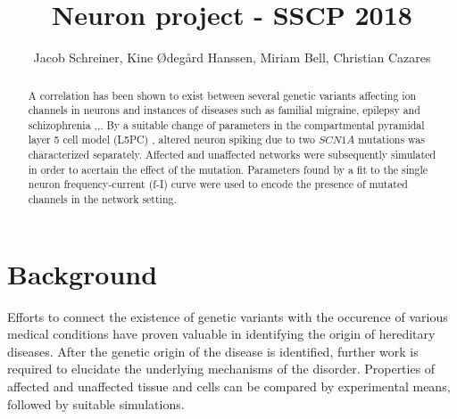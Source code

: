 \documentclass[twocolumn, a4paper,10pt, norsk]{scrartcl}
\title{Neuron project - SSCP 2018} %
\author{Jacob Schreiner, Kine Ødegård Hanssen, Miriam Bell, Christian Cazares}
\date{}
\begin{document}
\maketitle

\begin{abstract} %
 A correlation has been shown to exist between several genetic variants affecting ion channels in neurons and instances of diseases such as familial migraine, epilepsy and schizophrenia \cite{fhm},\cite{epilepsy},\cite{gautes}. By a suitable change of parameters in the compartmental pyramidal layer 5 cell model (L5PC) \cite{l5pc_model}, altered neuron spiking due to two $SCN1A$ mutations was characterized separately. Affected and unaffected networks were subsequently simulated in order to acertain the effect of the mutation. Parameters found by a fit to the single neuron frequency-current (f-I) curve were used to encode the presence of mutated channels in the network setting. %
\end{abstract}

\section*{Background}


Efforts to connect the existence of genetic variants with the occurence of various medical conditions have proven valuable in identifying the origin of hereditary diseases. After the genetic origin of the disease is identified, further work is required to elucidate the underlying mechanisms of the disorder. Properties of affected and unaffected tissue and cells can be compared by experimental means, followed by suitable simulations.

\end{document}
